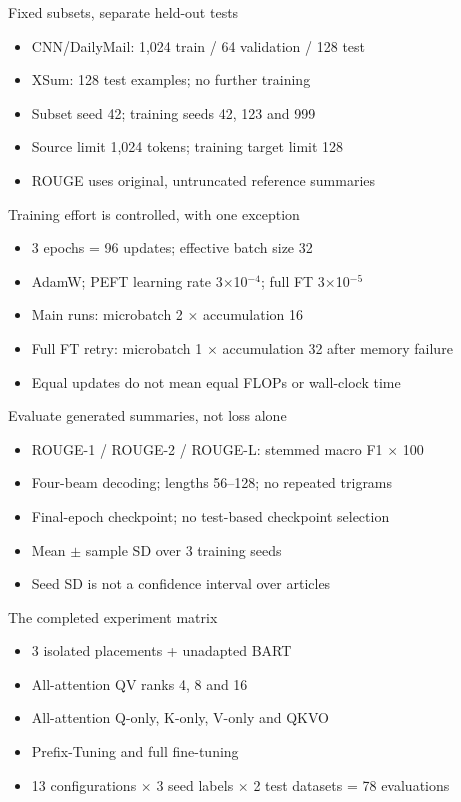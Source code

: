\documentclass[aspectratio=169,11pt]{beamer}
\begin{document}
\begin{frame}{Fixed subsets, separate held-out tests}
\begin{itemize}
\item CNN/DailyMail: 1,024 train / 64 validation / 128 test
\item XSum: 128 test examples; no further training
\item Subset seed 42; training seeds 42, 123 and 999
\item Source limit 1,024 tokens; training target limit 128
\item ROUGE uses original, untruncated reference summaries
\end{itemize}
\end{frame}
\begin{frame}{Training effort is controlled, with one exception}
\begin{itemize}
\item 3 epochs = 96 updates; effective batch size 32
\item AdamW; PEFT learning rate 3$\times$10$^{-4}$; full FT 3$\times$10$^{-5}$
\item Main runs: microbatch 2 $\times$ accumulation 16
\item Full FT retry: microbatch 1 $\times$ accumulation 32 after memory failure
\item Equal updates do not mean equal FLOPs or wall-clock time
\end{itemize}
\end{frame}
\begin{frame}{Evaluate generated summaries, not loss alone}
\begin{itemize}
\item ROUGE-1 / ROUGE-2 / ROUGE-L: stemmed macro F1 $\times$ 100
\item Four-beam decoding; lengths 56--128; no repeated trigrams
\item Final-epoch checkpoint; no test-based checkpoint selection
\item Mean $\pm$ sample SD over 3 training seeds
\item Seed SD is not a confidence interval over articles
\end{itemize}
\end{frame}
\begin{frame}{The completed experiment matrix}
\begin{itemize}
\item 3 isolated placements + unadapted BART
\item All-attention QV ranks 4, 8 and 16
\item All-attention Q-only, K-only, V-only and QKVO
\item Prefix-Tuning and full fine-tuning
\item 13 configurations $\times$ 3 seed labels $\times$ 2 test datasets = 78 evaluations
\end{itemize}
\end{frame}
\end{document}

